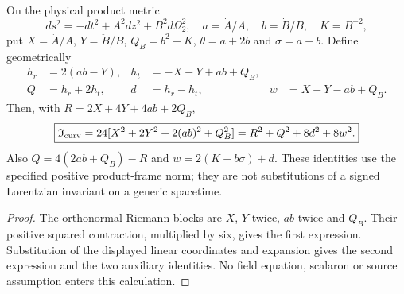 \documentclass[12pt,a4paper]{article}
\begin{document}
\begin{theorem}
\label{p8:thm:v2212-ks-positive-curvature}
On the physical product metric
\[
 ds^2=-dt^2+A^2dz^2+B^2d\Omega_2^2,
 \quad a=\dot A/A,\quad b=\dot B/B,\quad K=B^{-2},
\]
put $X=\ddot A/A$, $Y=\ddot B/B$, $Q_B=b^2+K$,
$\theta=a+2b$ and $\sigma=a-b$. Define geometrically
\begin{align}
 h_r&=2(ab-Y),& h_t&=-X-Y+ab+Q_B,\\
 Q&=h_r+2h_t,& d&=h_r-h_t,& w&=X-Y-ab+Q_B.
\end{align}
Then, with $R=2X+4Y+4ab+2Q_B$,
\begin{equation}
\label{p8:eq:v2212-positive-curvature-split}
 \boxed{\mathfrak I_{\rm curv}
 =24[X^2+2Y^2+2(ab)^2+Q_B^2]
 =R^2+Q^2+8d^2+8w^2.}
\end{equation}
Also $Q=4(2ab+Q_B)-R$ and $w=2(K-b\sigma)+d$.
These identities use the specified positive product-frame norm; they
are not substitutions of a signed Lorentzian invariant on a generic
spacetime.
\end{theorem}
\begin{proof}
The orthonormal Riemann blocks are $X$, $Y$ twice, $ab$ twice and $Q_B$.
Their positive squared contraction, multiplied by six, gives the first
expression. Substitution of the displayed linear coordinates and expansion
gives the second expression and the two auxiliary identities. No field
equation, scalaron or source assumption enters this calculation.
\end{proof}
\end{document}
